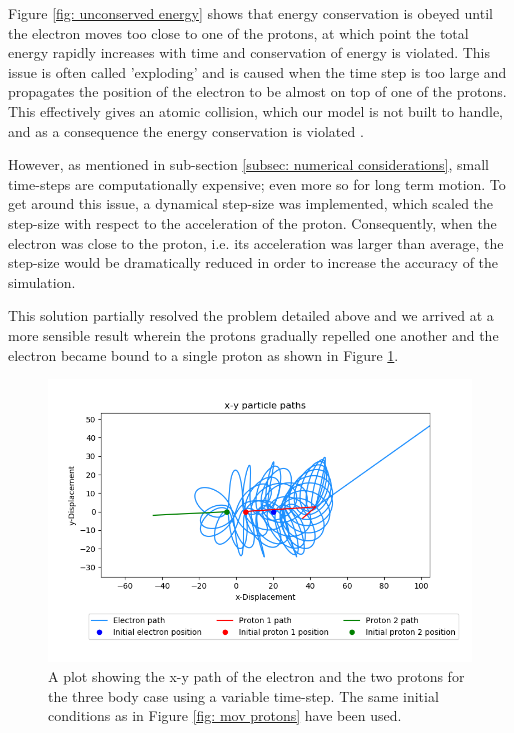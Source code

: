 \documentclass[12pt]{article} %
\numberwithin{equation}{subsection} %
\begin{document}
Figure \ref{fig: unconserved energy} shows that energy conservation is obeyed until the electron moves too close to one of the protons, at which point the total energy rapidly increases with time and conservation of energy is violated. This issue is often called 'exploding' and is caused when the time step is too large and propagates the position of the electron to be almost on top of one of the protons. This effectively gives an atomic collision, which our model is not built to handle, and as a consequence the energy conservation is violated \cite{kim2014issues}. \par
However, as mentioned in sub-section \ref{subsec: numerical considerations}, small time-steps are computationally expensive; even more so for long term motion. To get around this issue, a dynamical step-size was implemented, which scaled the step-size with respect to the acceleration of the proton. Consequently, when the electron was close to the proton, i.e. its acceleration was larger than average, the step-size would be dramatically reduced in order to increase the accuracy of the simulation. \par
This solution partially resolved the problem detailed above and we arrived at a more sensible result wherein the protons gradually repelled one another and the electron became bound to a single proton as shown in Figure \ref{fig: path variable time step}.
\begin{figure}[h]
    \centering
    \captionsetup{justification=centering}
	\includegraphics[scale=0.45]{images/pathVarTimeStep4.png}
	\caption{A plot showing the x-y path of the electron and the two protons for the three body case using a variable time-step. The same initial conditions as in Figure \ref{fig: mov protons} have been used.}
	\label{fig: path variable time step} 
	\end{figure}
\end{document}
